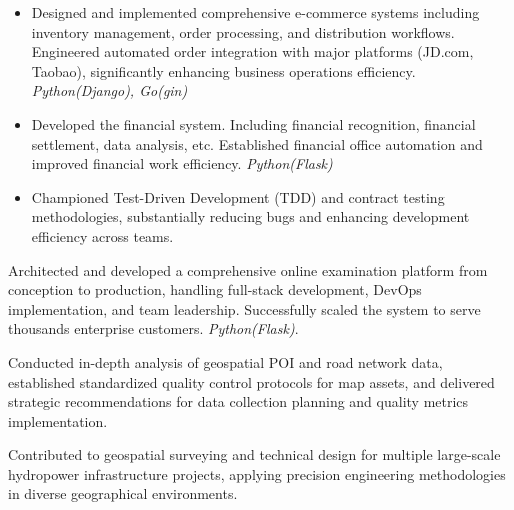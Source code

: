 \documentclass[11pt,a4paper]{moderncv}
\begin{document}
\vspace{0.2cm}

{
  \begin{itemize}
    \item Designed and implemented comprehensive e-commerce systems including inventory management, order processing, and distribution workflows. Engineered automated order integration with major platforms (JD.com, Taobao), significantly enhancing business operations efficiency. \textit{Python(Django), Go(gin)}
    \item Developed the financial system. Including financial recognition, financial settlement, data analysis, etc. Established financial office automation and improved financial work efficiency. \textit{Python(Flask)}
    \item Championed Test-Driven Development (TDD) and contract testing methodologies, substantially reducing bugs and enhancing development efficiency across teams.
  \end{itemize}
}

\vspace{0.2cm}

{
  Architected and developed a comprehensive online examination platform from conception to production, handling full-stack development, DevOps implementation, and team leadership. Successfully scaled the system to serve thousands enterprise customers. \textit{Python(Flask)}.
}

\vspace{0.2cm}

{
  Conducted in-depth analysis of geospatial POI and road network data, established standardized quality control protocols for map assets, and delivered strategic recommendations for data collection planning and quality metrics implementation.
}

\vspace{0.2cm}

{
  Contributed to geospatial surveying and technical design for multiple large-scale hydropower infrastructure projects, applying precision engineering methodologies in diverse geographical environments.
}
\end{document}
